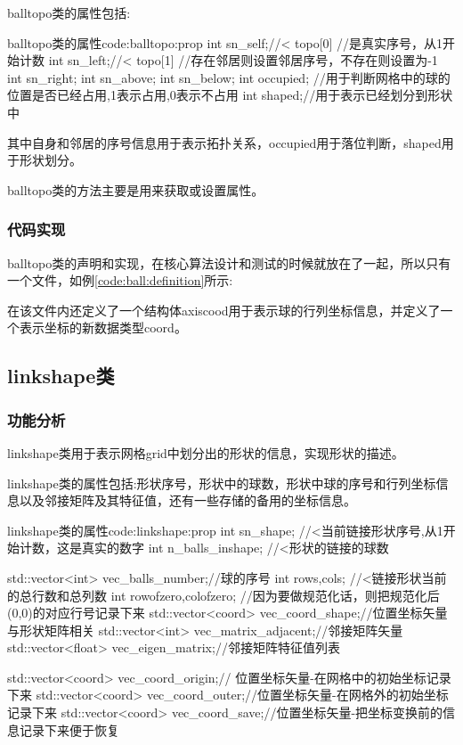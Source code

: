 \documentclass[11pt,twoside]{article} %
\begin{document}
balltopo类的属性包括:
\begin{codecpp}{balltopo类的属性}{code:balltopo:prop}
    int sn_self;//< topo[0]  //是真实序号，从1开始计数
    int sn_left;//< topo[1]  //存在邻居则设置邻居序号，不存在则设置为-1
    int sn_right;
    int sn_above;
    int sn_below;
	int occupied; //用于判断网格中的球的位置是否已经占用,1表示占用,0表示不占用
	int shaped;//用于表示已经划分到形状中
\end{codecpp}
其中自身和邻居的序号信息用于表示拓扑关系，occupied用于落位判断，shaped用于形状划分。

balltopo类的方法主要是用来获取或设置属性。

\subsubsection{代码实现}
balltopo类的声明和实现，在核心算法设计和测试的时候就放在了一起，所以只有一个文件，如例\ref{code:ball:definition}所示:

在该文件内还定义了一个结构体axiscood用于表示球的行列坐标信息，并定义了一个表示坐标的新数据类型coord。

\subsection{linkshape类}

\subsubsection{功能分析}
linkshape类用于表示网格grid中划分出的形状的信息，实现形状的描述。

linkshape类的属性包括:形状序号，形状中的球数，形状中球的序号和行列坐标信息以及邻接矩阵及其特征值，还有一些存储的备用的坐标信息。
\begin{codecpp}{linkshape类的属性}{code:linkshape:prop}
	int sn_shape; //<当前链接形状序号,从1开始计数，这是真实的数字
	int n_balls_inshape; //<形状的链接的球数

    std::vector<int> vec_balls_number;//球的序号
	int rows,cols; //<链接形状当前的总行数和总列数
    int rowofzero,colofzero; //因为要做规范化话，则把规范化后(0,0)的对应行号记录下来
	std::vector<coord> vec_coord_shape;//位置坐标矢量与形状矩阵相关
	std::vector<int> vec_matrix_adjacent;//邻接矩阵矢量
	std::vector<float> vec_eigen_matrix;//邻接矩阵特征值列表

    std::vector<coord> vec_coord_origin;// 位置坐标矢量-在网格中的初始坐标记录下来
    std::vector<coord> vec_coord_outer;//位置坐标矢量-在网格外的初始坐标记录下来
    std::vector<coord> vec_coord_save;//位置坐标矢量-把坐标变换前的信息记录下来便于恢复
\end{codecpp}
\end{document}
